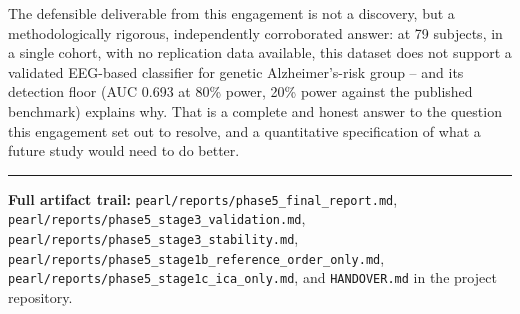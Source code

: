 \documentclass[11pt]{article}
\begin{document}
The defensible deliverable from this engagement is not a discovery, but a
methodologically rigorous, independently corroborated answer: at 79
subjects, in a single cohort, with no replication data available, this
dataset does not support a validated EEG-based classifier for genetic
Alzheimer's-risk group -- and its detection floor (AUC 0.693 at 80\%
power, 20\% power against the published benchmark) explains why. That is a
complete and honest answer to the question this engagement set out to
resolve, and a quantitative specification of what a future study would
need to do better.

\vspace{0.5cm}
\hrule
\vspace{0.3cm}
{\small\color{headergray}
\noindent\textbf{Full artifact trail:} \texttt{pearl/reports/phase5\_final\_report.md},
\texttt{pearl/reports/phase5\_stage3\_validation.md},
\texttt{pearl/reports/phase5\_stage3\_stability.md},
\texttt{pearl/reports/phase5\_stage1b\_reference\_order\_only.md},
\texttt{pearl/reports/phase5\_stage1c\_ica\_only.md}, and
\texttt{HANDOVER.md} in the project repository.
}
\end{document}

